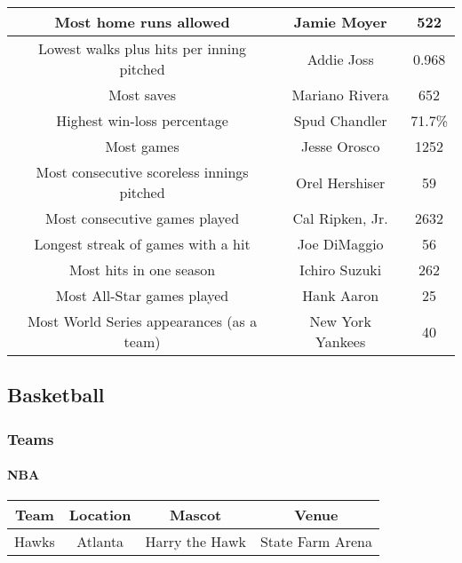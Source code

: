 \begin{center}
\begin{tabular}{|c|c|c|}
					\hline
					Most home runs allowed 	&	Jamie Moyer 	&	522	\\
					\hline
					Lowest walks plus hits per inning pitched 	&	Addie Joss 	&	0.968	\\
					\hline
					Most saves 	&	Mariano Rivera 	&	652	\\
					\hline
					Highest win-loss percentage 	&	Spud Chandler 	&	71.7\% 	\\
					\hline
					Most games 	&	Jesse Orosco 	&	1252	\\
					\hline
					Most consecutive scoreless innings pitched 	&	Orel Hershiser 	&	59\\
					\hline
					Most consecutive games played & Cal Ripken, Jr. & 2632 \\
					\hline
					Longest streak of games with a hit& Joe DiMaggio & 56 \\
					\hline
					Most hits in one season & Ichiro Suzuki& 262 \\
					\hline
					Most All-Star games played & Hank Aaron & 25 \\
					\hline
					Most World Series appearances (as a team)& New York Yankees &  40 \\
					\hline

				
					
				\end{tabular}
				\vspace{1 in}
			\end{center}			

			
			\newpage
		\subsection{Basketball}
			\subsubsection{Teams}
				\paragraph{NBA}
				\begin{center}
					\begin{tabular}{|c|c|c|c |}
						\hline
						\textbf{Team} & \textbf{Location} & \textbf{Mascot} & \textbf{Venue} \\
							\hline
						Hawks & Atlanta &  Harry the Hawk & State Farm Arena \\
						\hline
						
					\end{tabular}
				\end{center}				
				
